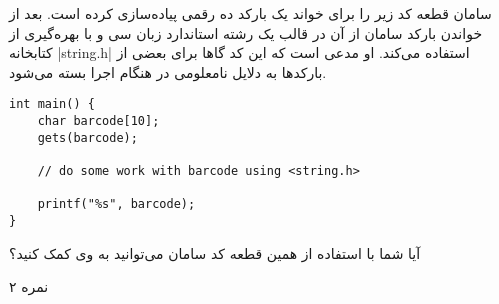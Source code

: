 \documentclass[../main.tex]{subfiles}
\begin{document}
سامان قطعه کد زیر را برای خواند یک بارکد ده رقمی پیاده‌سازی کرده است. بعد از خواندن بارکد سامان از آن در قالب یک رشته استاندارد زبان سی و با بهره‌گیری از کتابخانه |string.h| استفاده می‌کند.
او مدعی است که این کد گاها برای بعضی از بارکدها به دلایل نامعلومی در هنگام اجرا بسته می‌شود.

\begin{latin}
\begin{verbatim}
int main() {
    char barcode[10];
    gets(barcode);

    // do some work with barcode using <string.h>

    printf("%s", barcode);
}
\end{verbatim}
\end{latin}

آیا شما با استفاده از همین قطعه کد سامان می‌توانید به وی کمک کنید؟

۲ نمره
\end{document}
